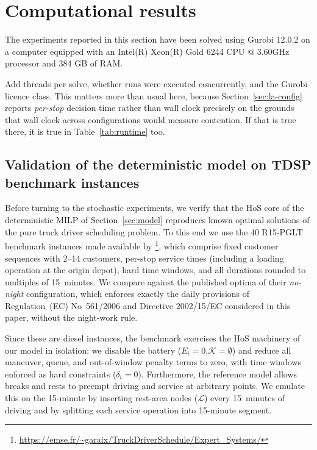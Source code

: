 \section{Computational results} \label{sec:results}
The experiments reported in this section have been solved using Gurobi 12.0.2 on a computer equipped with an Intel(R) Xeon(R) Gold 6244 CPU @ 3.60GHz processor and 384 GB of RAM.

\begin{atodo}
Add threads per solve, whether runs were executed concurrently, and the Gurobi
licence class. This matters more than usual here, because
Section~\ref{sec:la-config} reports \emph{per-stop} decision time rather than
wall clock precisely on the grounds that wall clock across configurations would
measure contention. If that is true there, it is true in
Table~\ref{tab:runtime} too.
\end{atodo}

\subsection{Validation of the deterministic model on TDSP benchmark instances}
\label{sec:validation}

Before turning to the stochastic experiments, we verify that the HoS core of the deterministic MILP of Section~\ref{sec:model} reproduces known optimal solutions of the pure truck driver scheduling problem. To this end we use the 40 R15-PGLT benchmark instances made available by \citet{garaix_label-setting_2024}\footnote{\url{https://emse.fr/~garaix/TruckDriverSchedule/Expert_Systems/}}, which comprise fixed customer sequences with 2--14 customers, per-stop service times (including a loading operation at the origin depot), hard time windows, and all durations rounded to multiples of 15~minutes. We compare against the published optima of their \emph{no-night} configuration, which enforces exactly the daily provisions of Regulation~(EC) No~561/2006 and Directive 2002/15/EC considered in this paper, without the night-work rule.

Since these are diesel instances, the benchmark exercises the HoS machinery of our model in isolation: we disable the battery ($E_i = 0$,$\mathcal K = \emptyset$) and reduce all maneuver, queue, and out-of-window penalty terms to zero, with time windows enforced as hard constraints ($\delta_i = 0$). Furthermore, the reference model allows breaks and rests to preempt driving and service at arbitrary points. We emulate this on the 15-minute by inserting rest-area nodes ($\mathcal L$) every 15~minutes of driving and by splitting each service operation into 15-minute segment.

